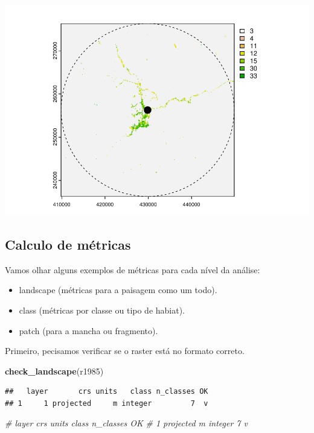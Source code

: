 \documentclass[
]{article}
\newenvironment{Shaded}{\begin{snugshade}}{\end{snugshade}}
\newcommand{\CommentTok}[1]{\textcolor[rgb]{0.56,0.35,0.01}{\textit{#1}}}
\newcommand{\FunctionTok}[1]{\textcolor[rgb]{0.13,0.29,0.53}{\textbf{#1}}}
\newcommand{\NormalTok}[1]{#1}
\providecommand{\tightlist}{%
  \setlength{\itemsep}{0pt}\setlength{\parskip}{0pt}}
\begin{document}
\includegraphics{epr_files/figure-latex/fig-plot-raster-1.pdf}

\hypertarget{calculo-de-muxe9tricas-1}{%
\subsection{Calculo de métricas}\label{calculo-de-muxe9tricas-1}}

Vamos olhar alguns exemplos de métricas para cada nível da análise:

\begin{itemize}
\tightlist
\item
  landscape (métricas para a paisagem como um todo).
\item
  class (métricas por classe ou tipo de habiat).
\item
  patch (para a mancha ou fragmento).
\end{itemize}

Primeiro, pecisamos verificar se o raster está no formato correto.

\begin{Shaded}
\begin{Highlighting}[]
\FunctionTok{check\_landscape}\NormalTok{(r1985)}
\end{Highlighting}
\end{Shaded}

\begin{verbatim}
##   layer       crs units   class n_classes OK
## 1     1 projected     m integer         7  v
\end{verbatim}

\begin{Shaded}
\begin{Highlighting}[]
\CommentTok{\#  layer crs    units   class n\_classes OK}
\CommentTok{\#  1  projected   m   integer         7  v}
\end{Highlighting}
\end{Shaded}
\end{document}
